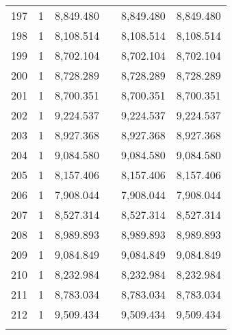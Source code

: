 \begin{table}[!htbp]
\begin{tabular}{@{\extracolsep{5pt}}lccccc}
197 & 1 & 8,849.480 &  & 8,849.480 & 8,849.480 \\ 
198 & 1 & 8,108.514 &  & 8,108.514 & 8,108.514 \\ 
199 & 1 & 8,702.104 &  & 8,702.104 & 8,702.104 \\ 
200 & 1 & 8,728.289 &  & 8,728.289 & 8,728.289 \\ 
201 & 1 & 8,700.351 &  & 8,700.351 & 8,700.351 \\ 
202 & 1 & 9,224.537 &  & 9,224.537 & 9,224.537 \\ 
203 & 1 & 8,927.368 &  & 8,927.368 & 8,927.368 \\ 
204 & 1 & 9,084.580 &  & 9,084.580 & 9,084.580 \\ 
205 & 1 & 8,157.406 &  & 8,157.406 & 8,157.406 \\ 
206 & 1 & 7,908.044 &  & 7,908.044 & 7,908.044 \\ 
207 & 1 & 8,527.314 &  & 8,527.314 & 8,527.314 \\ 
208 & 1 & 8,989.893 &  & 8,989.893 & 8,989.893 \\ 
209 & 1 & 9,084.849 &  & 9,084.849 & 9,084.849 \\ 
210 & 1 & 8,232.984 &  & 8,232.984 & 8,232.984 \\ 
211 & 1 & 8,783.034 &  & 8,783.034 & 8,783.034 \\ 
212 & 1 & 9,509.434 &  & 9,509.434 & 9,509.434 \\ 
\hline \\[-1.8ex] 
\end{tabular} 
\end{table} 
